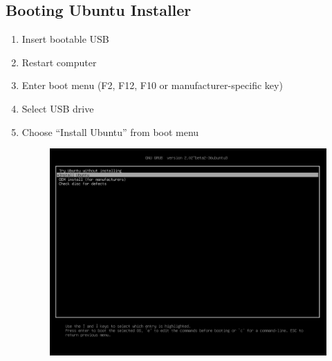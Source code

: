 \documentclass[11pt,a4paper]{article}
\begin{document}
\subsection{Booting Ubuntu Installer}
\begin{enumerate}
    \item Insert bootable USB
    \item Restart computer
    \item Enter boot menu (F2, F12, F10 or manufacturer-specific key)
    \item Select USB drive
    \item Choose ``Install Ubuntu'' from boot menu
    \begin{figure}[htp]
        \centering
        \includegraphics[width=0.6\linewidth]{images/step4.png}
        \label{fig:enter-label}
    \end{figure}
\end{enumerate}
\end{document}
